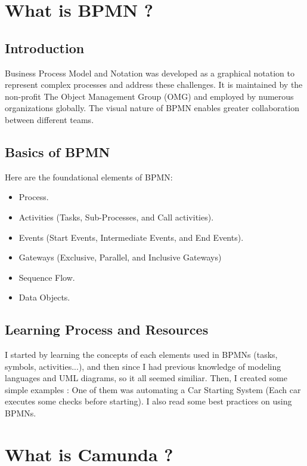 \documentclass[12pt]{article}
\begin{document}
{\section{What is BPMN ?}

  \subsection{Introduction}

Business Process Model and Notation was developed as a graphical notation to represent complex processes and address these challenges. It is maintained by the non-profit The Object Management Group (OMG) and employed by numerous organizations globally. The visual nature of BPMN enables greater collaboration between different teams.

  \subsection{Basics of BPMN}

Here are the foundational elements of BPMN:

  \begin{itemize}
    \item Process.
    \item Activities (Tasks, Sub-Processes, and Call activities).
    \item Events (Start Events, Intermediate Events, and End Events).
    \item Gateways (Exclusive, Parallel, and Inclusive Gateways)
    \item Sequence Flow.
    \item Data Objects.
  \end{itemize}

\pagebreak

  \subsection{Learning Process and Resources}
I started by learning the concepts of each elements used in BPMNs (tasks, symbols, activities...), and then since I had previous knowledge of modeling languages and UML diagrams, so it all seemed similiar.
Then, I created some simple examples :
One of them was automating a Car Starting System (Each car executes some checks before starting).
I also read some best practices on using BPMNs.

\section{What is Camunda ?}

}
\end{document}
